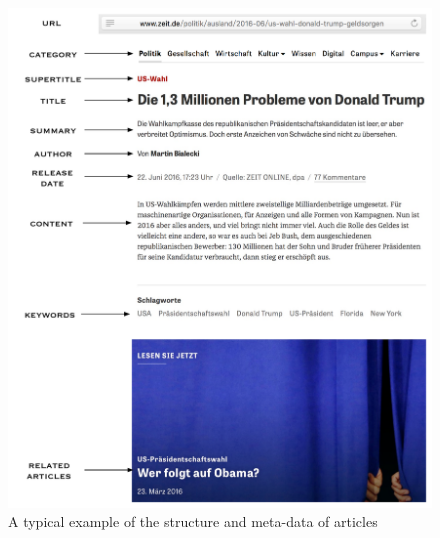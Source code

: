 \begin{figure}[!htb]
\centering
\includegraphics[width=1\textwidth]{fig/article.pdf}
\caption{A typical example of the structure and meta-data of articles}
\label{fig:article_structure}
\end{figure}

